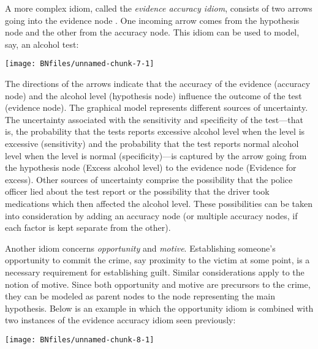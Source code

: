 \documentclass{article}
\begin{document}
A more complex idiom, called the \emph{evidence accuracy
idiom}, consists of two arrows going into the evidence node \citep{bovens2004bayesian, friedman1974}. One incoming arrow comes from the hypothesis node and the other from the accuracy node. This idiom can be used to model, say, 
an alcohol test:
%
\begin{center}\texttt{[image: BNfiles/unnamed-chunk-7-1]} \end{center}
%
\noindent The directions of the arrows indicate that the accuracy of the evidence (accuracy node) and the alcohol level (hypothesis node) influence the outcome of the test (evidence node). The graphical model represents different sources of uncertainty. The uncertainty associated with the sensitivity and specificity of the test---that is, the probability that the tests reports excessive alcohol level when the level is excessive (sensitivity) and the probability that the test reports normal alcohol level when the level is normal (specificity)---is captured by the arrow  going from the hypothesis node (\textsf{Excess alcohol level}) to the evidence node (\textsf{Evidence for excess}). Other sources of uncertainty comprise the possibility that the police officer lied about the test report or
the possibility that the driver took medications which then affected the alcohol level. These possibilities can be taken into consideration by adding an accuracy node (or multiple accuracy nodes, if each factor is kept separate from the other).



Another idiom concerns  \textit{opportunity} and \textit{motive}. Establishing someone's opportunity to commit the crime, say proximity to the victim at some point, is a necessary requirement for establishing guilt. Similar considerations apply to the notion of motive. Since both opportunity and motive are precursors to the crime, they can be modeled as parent nodes to the node representing the main hypothesis.
 Below is an example in which the opportunity idiom is combined with  two instances of the evidence accuracy idiom seen previously:


\begin{center}\texttt{[image: BNfiles/unnamed-chunk-8-1]} \end{center}
\end{document}
